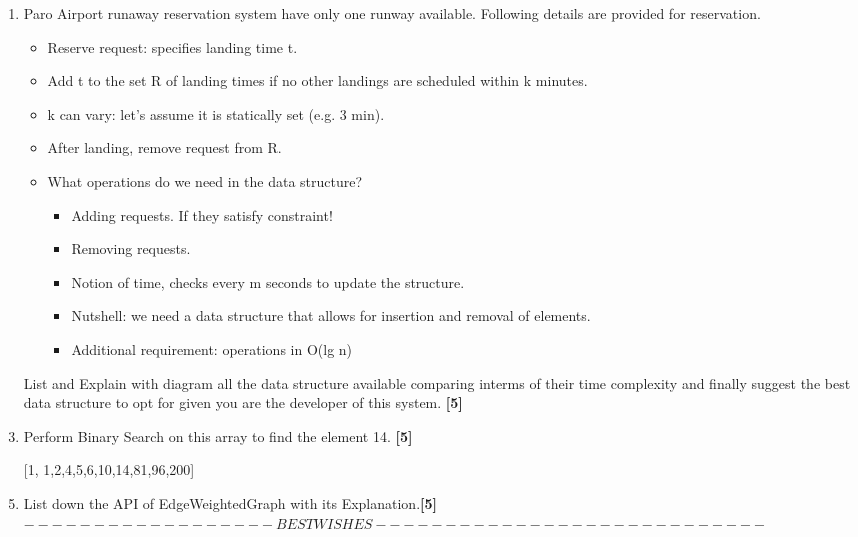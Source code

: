 \documentclass[12pt ,a4paper]{exam}
\begin{document}
\begin{enumerate}[start=1,label={\bfseries Q\arabic*)}]
		\item Paro Airport runaway reservation system have only one runway available. Following details are provided for reservation. 
	\begin{itemize}
		\item Reserve request: specifies landing time t.
		\item Add t to the set R of landing times if no other landings are
		scheduled within k minutes.
		\item k can vary: let’s assume it is statically set (e.g. 3 min). 
		\item After landing, remove request from R.
		\item What operations do we need in the data structure?
		\begin{itemize}
			\item Adding requests. If they satisfy constraint!
			\item Removing requests.
			\item Notion of time, checks every m seconds to update the structure.
			\item Nutshell: we need a data structure that allows for insertion and removal of elements.
			\item Additional requirement: operations in O(lg n)
		\end{itemize}
	\end{itemize}
	\item [] List and Explain with diagram all the data structure available comparing interms of their time complexity and finally suggest the best data structure to opt for given you are the developer of this system.  \hfill\textbf{[5]}
    \item Perform Binary Search on this array to find the element 14. \hfill\textbf{[5]}
    \item [] [1, 1,2,4,5,6,10,14,81,96,200]\\
    \item List down the API of  EdgeWeightedGraph with its Explanation.\hfill\textbf{[5]}\\
	$------------ ------BEST WISHES----------------------------$
	\end{enumerate}
	
\end{document}
